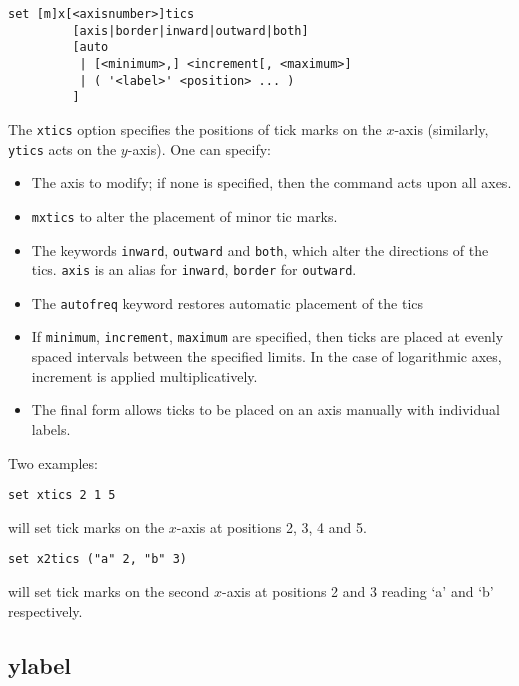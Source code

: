 \begin{verbatim}
set [m]x[<axisnumber>]tics
         [axis|border|inward|outward|both]
         [auto
          | [<minimum>,] <increment[, <maximum>]
          | ( '<label>' <position> ... )
         ]
\end{verbatim}

The {\tt xtics} option specifies the positions of tick marks on the $x$-axis
(similarly, {\tt ytics} acts on the $y$-axis).  One can specify:

\begin{itemize}
\item The axis to modify; if none is specified, then the command acts upon all axes.

\item {\tt mxtics} to alter the placement of minor tic marks.

\item The keywords {\tt inward}, {\tt outward} and {\tt both}, which alter the
directions of the tics.  {\tt axis} is an alias for {\tt inward}, {\tt border}
for {\tt outward}.

\item The {\tt autofreq} keyword restores automatic placement of the tics

\item If {\tt minimum}, {\tt increment}, {\tt maximum} are specified, then ticks
are placed at evenly spaced intervals between the specified limits. In the case
of logarithmic axes, increment is applied multiplicatively.

\item The final form allows ticks to be placed on an axis manually with
individual labels.
\end{itemize}

Two examples:

\begin{verbatim}
set xtics 2 1 5
\end{verbatim}

\noindent will set tick marks on the $x$-axis at positions 2, 3, 4 and 5.

\begin{verbatim}
set x2tics ("a" 2, "b" 3)
\end{verbatim}

\noindent will set tick marks on the second $x$-axis at positions 2 and 3 reading `a' and
`b' respectively.


\subsection{ylabel}

